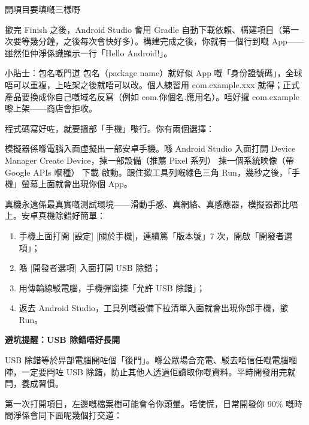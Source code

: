 \begin{center}\small\color{gray}開項目要填嘅三樣嘢\end{center}

撳完 Finish 之後，Android Studio 會用 Gradle 自動下載依賴、構建項目（第一次要等幾分鐘，之後每次會快好多）。構建完成之後，你就有一個行到嘅 App——雖然佢仲淨係識顯示一行「Hello Android!」。

\begin{tcbinfo}{小貼士：包名嘅門道}
包名（package name）就好似 App 嘅「身份證號碼」，全球唔可以重複，上咗架之後就唔可以改。個人練習用 com.example.xxx 就得；正式產品要換成你自己嘅域名反寫（例如 com.你個名.應用名）。唔好攞 com.example 嚟上架——商店會拒收。

\end{tcbinfo}


程式碼寫好咗，就要搵部「手機」嚟行。你有兩個選擇：


模擬器係喺電腦入面虛擬出一部安卓手機。喺 Android Studio 入面打開 Device Manager Create Device，揀一部設備（推薦 Pixel 系列） 揀一個系統映像（帶 Google APIs 嗰種） 下載 啟動。跟住撳工具列嘅綠色三角 Run，幾秒之後，「手機」螢幕上面就會出現你個 App。


真機永遠係最真實嘅測試環境——滑動手感、真網絡、真感應器，模擬器都比唔上。安卓真機除錯好簡單：

\begin{enumerate}
  \item 手機上面打開 [設定] [關於手機]，連續篤「版本號」7 次，開啟「開發者選項」；
  \item 喺 [開發者選項] 入面打開 USB 除錯；
  \item 用傳輸線駁電腦，手機彈窗揀「允許 USB 除錯」；
  \item 返去 Android Studio，工具列嘅設備下拉清單入面就會出現你部手機，撳 Run。
\end{enumerate}

\textbf{避坑提醒：USB 除錯唔好長開}\par

USB 除錯等於畀部電腦開咗個「後門」。喺公眾場合充電、駁去唔信任嘅電腦嗰陣，一定要閂咗 USB 除錯，防止其他人透過佢讀取你嘅資料。平時開發用完就閂，養成習慣。


第一次打開項目，左邊嘅檔案樹可能會令你頭暈。唔使慌，日常開發你 90\% 嘅時間淨係會同下面呢幾個打交道：

